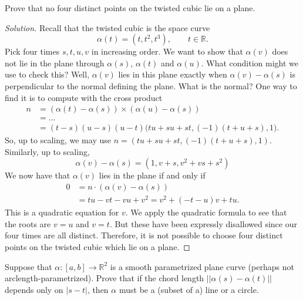 \documentclass[Shifrin_Solutions_Spring_2018]{subfiles}
\begin{document}
\vspace{.5cm}


\begin{exercise}
Prove that no four distinct points on the twisted cubic lie on a plane.
\end{exercise}

\begin{proof}[Solution]
Recall that the twisted cubic is the space curve
\[
\alpha(t) = (t,t^2, t^3), \qquad t \in \mathbb{R}.
\]
Pick four times $s,t,u,v$ in increasing order. We want to show that $\alpha(v)$ does not lie in the plane through $\alpha(s)$, $\alpha(t)$ and $\alpha(u)$. What condition might we use to check this?
Well, $\alpha(v)$ lies in this plane exactly when $\alpha(v)-\alpha(s)$ is perpendicular to the normal defining the plane. What is the normal? One way to find it is to compute with the cross product
\[
\begin{split}
n & = (\alpha(t)-\alpha(s)) \times (\alpha(u)-\alpha(s)) \\
	& = \dots \\
	& = (t-s)(u-s)(u-t) \Big( tu + su + st , (-1)(t + u + s) , 1 \Big) .
\end{split}
\]
So, up to scaling, we may use $n = ( tu + su + st, (-1)(t+u+s), 1) $. Similarly, up to scaling,
\[
\alpha(v) - \alpha(s) = (1, v+s , v^2 + vs + s^2 )
\]
We now have that $\alpha(v)$ lies in the plane if and only if
\[
\begin{split}
0 & = n \cdot (\alpha(v) - \alpha(s) ) \\
	& = tu - vt - vu + v^2   = v^2 + (-t-u) v + tu .
\end{split}
\]
This is a quadratic equation for $v$. We apply the quadratic formula to see that the roots are  $v = u$ and $v= t$. But these have been expressly disallowed since our four times are all distinct. Therefore, it is not possible to choose four distinct points on the twisted cubic which lie on a plane.
\end{proof}


\vfill
\pagebreak



\begin{exercise}
Suppose that $\alpha:[a,b]\rightarrow \mathbb{R}^2$ is a smooth parametrized plane curve (perhaps not arclength-parametrized). Prove that if the chord length $||\alpha(s) - \alpha(t) ||$ depends only on $|s-t|$, then $\alpha$ must be a (subset of a) line or a circle.
\end{exercise}
\end{document}
